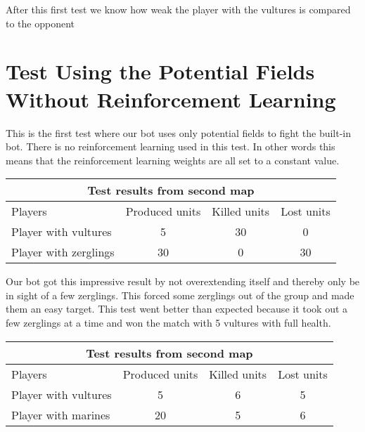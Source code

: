 After this first test we know how weak the player with the vultures is compared to the opponent
\section{Test Using the Potential Fields Without Reinforcement Learning} %
This is the first test where our bot uses only potential fields  to fight the built-in bot. There is no reinforcement learning used in this test. In other words this means that the reinforcement learning weights are all set to a constant value.\\

\begin{centering}
\begin{table}
 \begin{tabular}{|l|c|c|c|}
	\multicolumn{4}{c}{Test results from second map} \\
	\hline
	Players & Produced units & Killed units & Lost units\\
	\hline
	\hline
		Player with vultures & 5 & 30 & 0\\
	\hline
		Player with zerglings & 30 & 0 & 30\\
	\hline

\end{tabular}
\end{table}
\end{centering}

Our bot got this impressive result by not overextending itself and thereby only be in sight of a few zerglings. This forced some zerglings out of the group and made them an easy target. This test went better than expected because it took out a few zerglings at a time and won the match with 5 vultures with full health.\\

\begin{centering}
\begin{table}
 \begin{tabular}{|l|c|c|c|}
	\multicolumn{4}{c}{Test results from second map} \\
	\hline
	Players & Produced units & Killed units & Lost units\\
	\hline
	\hline
		Player with vultures & 5 & 6 & 5\\
	\hline
		Player with marines & 20 & 5 & 6\\
	\hline

\end{tabular}
\end{table}
\end{centering}


